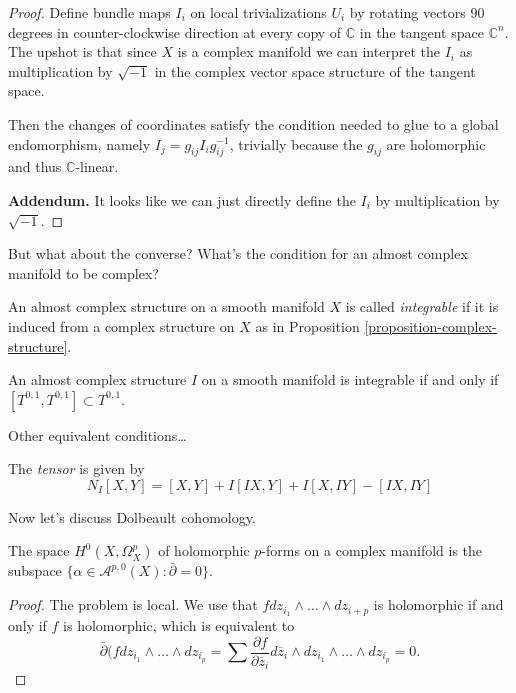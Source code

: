 \documentclass{book}
\begin{document}
\begin{proof}
Define bundle maps $I_i$ on local
trivializations $U_i$
by rotating vectors $90$ degrees in
counter-clockwise
direction at every copy of $\mathbb{C}$ in
the tangent space $\mathbb{C}^n$.
The upshot is that since $X$ is a complex
manifold
we can interpret the $I_i$ as multiplication
by $\sqrt{-1}$
in the complex vector space structure of the
tangent space.

Then the changes of coordinates satisfy the
condition
needed to glue to a global endomorphism,
namely
$I_j=g_{ij}I_ig_{ij}^{-1}$, trivially because
the $g_{ij}$ are holomorphic and thus
$\mathbb{C}$-linear.

\noindent
{\bf Addendum.} It looks like we can just
directly
define the $I_i$ by multiplication by
$\sqrt{-1}$.
\end{proof}


\noindent
But what about the converse?
What's the condition for an almost complex
manifold to be complex?

\begin{definition}
\label{definition-integ-almos-compl-struc}
An almost complex structure on a smooth
manifold $X$
is called {\it integrable} if it is induced
from a
complex structure on $X$ as in Proposition
\ref{proposition-complex-structure}.
\end{definition}

\begin{theorem}
\label{theorem-newlander-nirenberg}
An almost complex structure $I$
on a smooth manifold is integrable if and
only if
$[T^{0,1},T^{0,1}]\subset T^{0,1}$.
\end{theorem}

Other equivalent conditions…

The {\it tensor} is given by
$$
N_I[X,Y]=[X,Y]+I[IX,Y]+I[X,IY]-[IX,IY]
$$




\medskip\noindent
Now let's discuss Dolbeault cohomology.


\begin{proposition}
\label{proposition-dolbeault-proposition}
\begin{reference}
\cite[Proposition 2.6.11]{huc}
\end{reference}
The space $H^0(X,\Omega^p_X)$ of holomorphic
$p$-forms on a complex manifold is the
subspace
$\{\alpha \in
\mathcal{A}^{p,0}(X):\bar\partial=0\}$.
\end{proposition}

\begin{proof}
The problem is local.
We use that $f dz_{i_1}\wedge…\wedge
dz_{i+p}$ is holomorphic
if and only if $f$ is holomorphic, which is
equivalent to
$$
\bar\partial(fdz_{i_1}\wedge…\wedge dz_{i_p}
=\sum \frac{\partial f}{\partial
\overline{z}_i}d\overline{z}_i
\wedge dz_{i_1}\wedge…\wedge dz_{i_p}=0.
$$
\end{proof}
\end{document}
